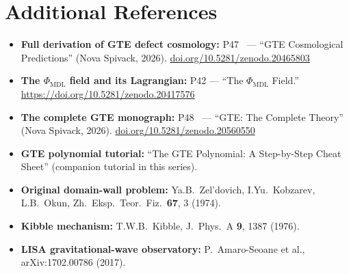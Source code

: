 \documentclass[11pt,a4paper]{article}
\newcommand{\PHIMDL}{\Phi_{\mathrm{MDL}}}
\begin{document}
\section{Additional References}

\begin{itemize}
\item \textbf{Full derivation of GTE defect cosmology:}
  P47~\cite{SpivackGTECosmology} --- ``GTE Cosmological Predictions'' (Nova Spivack, 2026).
  \href{https://doi.org/10.5281/zenodo.20465803}{doi.org/10.5281/zenodo.20465803}

\item \textbf{The $\PHIMDL$ field and its Lagrangian:}
  P42 --- ``The $\Phi_\mathrm{MDL}$ Field.''
  \\\url{https://doi.org/10.5281/zenodo.20417576}

\item \textbf{The complete GTE monograph:}
  P48~\cite{SpivackGTECompleteFramework} --- ``GTE: The Complete Theory'' (Nova Spivack, 2026).
  \href{https://doi.org/10.5281/zenodo.20560550}{doi.org/10.5281/zenodo.20560550}

\item \textbf{GTE polynomial tutorial:}
  ``The GTE Polynomial: A Step-by-Step Cheat Sheet''
  (companion tutorial in this series).

\item \textbf{Original domain-wall problem:}
  Ya.B.~Zel'dovich, I.Yu.~Kobzarev, L.B.~Okun,
  Zh.\ Eksp.\ Teor.\ Fiz.\ \textbf{67}, 3 (1974).

\item \textbf{Kibble mechanism:}
  T.W.B.~Kibble, J.\ Phys.\ A \textbf{9}, 1387 (1976).

\item \textbf{LISA gravitational-wave observatory:}
  P.\ Amaro-Seoane et al., arXiv:1702.00786 (2017).
\end{itemize}
\end{document}
